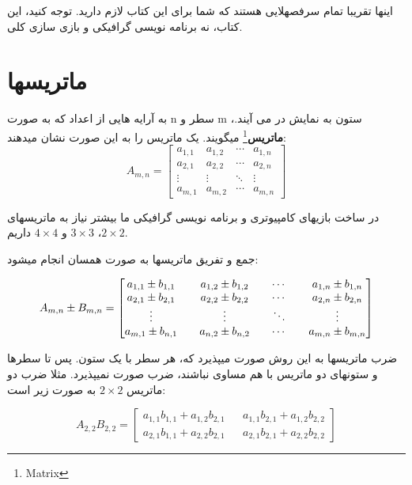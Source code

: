 \documentclass[14pt,a4paper]{memoir}
\begin{document}
	 
	 اینها تقریبا تمام سرفصهلایی هستند که شما برای این کتاب لازم دارید. توجه کنید، این کتاب، نه برنامه نویسی گرافیکی و بازی سازی کلی.
	 
	 \section{ماتریسها}\label{matrix}
	 
	 به آرایه هایی از اعداد که به صورت n سطر و m ستون به نمایش در می آیند.، \textbf{ماتریس}\footnote{Matrix} میگویند. یک ماتریس را به این صورت نشان میدهند:
	 \[ A_{m, n} = \begin{bmatrix}
	  a_{1,1} & a_{1,2} & \cdots & a_{1,n} \\
	 a_{2,1} & a_{2,2} & \cdots & a_{2,n} \\
	 \vdots  & \vdots  & \ddots & \vdots  \\
	 a_{m,1} & a_{m,2} & \cdots & a_{m,n}
	 \end{bmatrix} \]
	 
	 
	 در ساخت بازیهای کامپیوتری و برنامه نویسی گرافیکی ما بیشتر نیاز به ماتریسهای $ 2\times2 $، $ 3\times3 $  و $ 4\times 4$ داریم.
	 
	 جمع و تفریق ماتریسها به صورت همسان انجام میشود:
	 
	 \[ A_{m, n}\pm B_{m, n} = \begin{bmatrix}
	 a_{1, 1} \pm b_{1, 1} && a_{1, 2} \pm b_{1, 2} && \cdots &&  a_{1, n} \pm b_{1, n} \\
	 a_{2, 1} \pm b_{2, 1} && a_{2, 2} \pm b_{2, 2} && \cdots &&  a_{2, n} \pm b_{2, n} \\
	 \vdots  && \vdots  && \ddots && \vdots \\
	 a_{m, 1} \pm b_{n, 1} && a_{n, {\tiny }2} \pm b_{n, 2} && \cdots &&  a_{m, n} \pm b_{m, n}
	 	
	 \end{bmatrix} \]
	 
	 ضرب ماتریسها به این روش صورت میپذیرد که، هر سطر با یک ستون. پس تا سطرها و ستونهای دو ماتریس با هم مساوی نباشند، ضرب صورت نمیپذیرد. مثلا ضرب دو ماتریس $ 2\times2 $ به صورت زیر است:
	 
	 \[ A_{2, 2}B_{2, 2} = \begin{bmatrix}
	 a_{1, 1} b_{1, 1} + a_{1, 2}  b_{2, 1} && a_{1, 1} b_{2, 1} + a_{1, 2}  b_{2, 2} \\
	 	a_{2, 1}  b_{1, 1} + a_{2, 2}  b_{2, 1} && a_{2, 1}  b_{2, 1} + a_{2, 2}  b_{2, 2}
	 \end{bmatrix} \]
	 
	
	 
\end{document}
